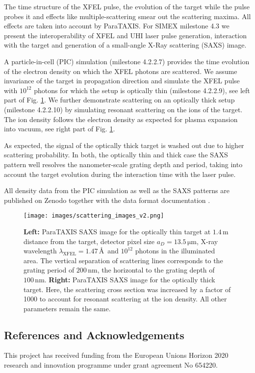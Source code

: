\documentclass[a4paper]{article}
\begin{document}
The time structure of the XFEL pulse, the evolution of the target while the pulse probes it and effects like multiple-scattering smear out the scattering maxima. All effects are taken into account by ParaTAXIS. For SIMEX milestone 4.3 we present the interoperability of XFEL and UHI laser pulse generation, interaction with the target and generation of a small-angle X-Ray scattering (SAXS) image.

A particle-in-cell (PIC) simulation (milestone 4.2.2.7) provides the time evolution of the electron density on which the XFEL photons are scattered. We assume invariance of the target in propagation direction and simulate the XFEL pulse with $10^{12}$ photons for which the setup is optically thin (milestone 4.2.2.9), see left part of Fig. \ref{fig:scattering}. We further demonstrate scattering on an optically thick setup (milestone 4.2.2.10) by simulating resonant scattering on the ions of the target. The ion density follows the electron density as expected for plasma expansion into vacuum\cite{Mora2003}, see right part of Fig. \ref{fig:scattering}.

As expected, the signal of the optically thick target is washed out due to higher scattering probability. In both, the optically thin and thick case the SAXS pattern well resolves the nanometer-scale grating depth and period, taking into account the target evolution during the interaction time with the laser pulse.

All density data from the PIC simulation as well as the SAXS patterns are published on Zenodo together with the data format documentation \cite{Garten2017}.

\begin{figure}
\centering
  \texttt{[image: images/scattering\_images\_v2.png]}
\caption{
\textbf{Left:} ParaTAXIS SAXS image for the optically thin target at $1.4\,\mathrm{m}$ distance from the target, detector pixel size $a_D = 13.5\,\mathrm{\mu m}$, X-ray wavelength $\lambda_\mathrm{XFEL} = 1.47\,$\AA\ and $10^{12}$ photons in the illuminated area. The vertical separation of scattering lines corresponds to the grating period of $200\,\mathrm{nm}$, the horizontal to the grating depth of $100\,\mathrm{nm}$.
\textbf{Right:} ParaTAXIS SAXS image for the optically thick target. Here, the scattering cross section was increased by a factor of 1000 to account for resonant scattering at the ion density. All other parameters remain the same.
}
  \label{fig:scattering}
\end{figure}


\FloatBarrier
\subsection{References and Acknowledgements}

This project has received funding from the European Unions Horizon 2020 research and innovation programme under grant agreement No 654220.



\end{document}
